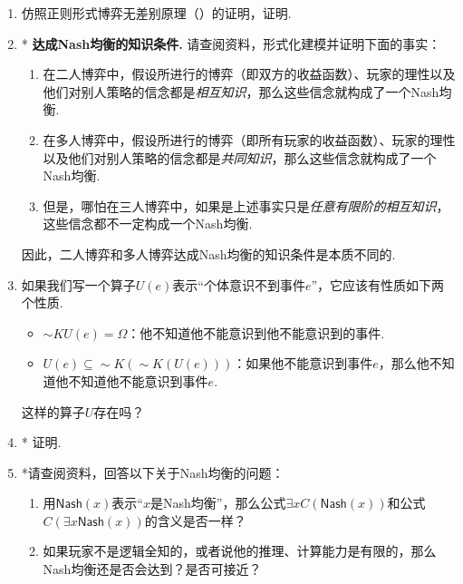 \begin{enumerate}[wide, labelindent=0pt]
    \item \label{exercise:exante-expost-equivalence} 仿照正则形式博弈无差别原理（）的证明，证明.

    \item *\label{exercise:Aumann-NE-common-knowledge} \textbf{达成Nash均衡的知识条件. }请查阅资料，形式化建模并证明下面的事实：
    \begin{enumerate}
        \item 在二人博弈中，假设所进行的博弈（即双方的收益函数）、玩家的理性以及他们对别人策略的信念都是\textit{相互知识}，那么这些信念就构成了一个Nash均衡. 
        \item 在多人博弈中，假设所进行的博弈（即所有玩家的收益函数）、玩家的理性以及他们对别人策略的信念都是\textit{共同知识}，那么这些信念就构成了一个Nash均衡. 
        \item 但是，哪怕在三人博弈中，如果是上述事实只是\textit{任意有限阶的相互知识}，这些信念都不一定构成一个Nash均衡.
    \end{enumerate}
    因此，二人博弈和多人博弈达成Nash均衡的知识条件是本质不同的.

    \item \label{exercise:awareness-axiom} 如果我们写一个算子$U(e)$表示“个体意识不到事件$e$”，它应该有性质如下两个性质. 
    \begin{itemize}
        \item $\sim KU(e)=\Omega$：他不知道他不能意识到他不能意识到的事件.
        \item $U(e)\subseteq \sim K(\sim K(U(e)))$：如果他不能意识到事件$e$，那么他不知道他不知道他不能意识到事件$e$.
    \end{itemize}
    这样的算子$U$存在吗？

    \item *\label{exercise:Aumann-operator-iff} 证明.
    
    \item *请查阅资料，回答以下关于Nash均衡的问题：
    \begin{enumerate}
        \item 用$\mathsf{Nash}(x)$表示“$x$是Nash均衡”，那么公式$\exists x C(\mathsf{Nash}(x))$和公式$C(\exists x \mathsf{Nash}(x))$的含义是否一样？
        \item 如果玩家不是逻辑全知的，或者说他的推理、计算能力是有限的，那么Nash均衡还是否会达到？是否可接近？
    \end{enumerate}
\end{enumerate}
